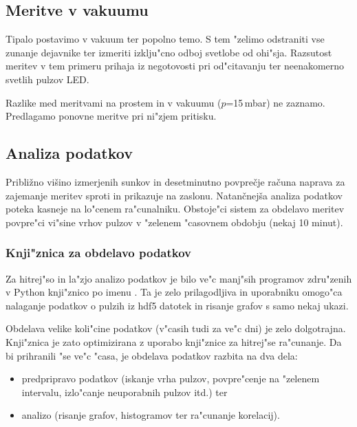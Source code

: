 \documentclass[12pt,a4paper]{article}
\begin{document}
\subsection{Meritve v vakuumu}
Tipalo postavimo v vakuum ter popolno temo. S tem "zelimo odstraniti vse zunanje dejavnike ter izmeriti izklju"cno odboj svetlobe od ohi"sja. Razsutost meritev v tem primeru prihaja iz negotovosti pri od"citavanju ter neenakomerno svetlih pulzov LED.

Razlike med meritvami na prostem in v vakuumu ($p$=15\,mbar) ne zaznamo. Predlagamo ponovne meritve pri ni"zjem pritisku.

\subsection{Analiza podatkov}

Približno višino izmerjenih sunkov in desetminutno povprečje računa naprava za zajemanje meritev sproti in prikazuje na zaslonu. 
Natančnejša analiza podatkov poteka kasneje na lo"cenem ra"cunalniku.  Obstoje"ci sistem za obdelavo meritev povpre"ci vi"sine vrhov pulzov v "zelenem "casovnem obdobju (nekaj 10 minut).


\subsubsection{Knji"znica za obdelavo podatkov}
Za hitrej"so in la"zjo analizo podatkov je bilo ve"c manj"sih programov zdru"zenih v Python knji"znico po imenu . Ta je zelo prilagodljiva in uporabniku omogo"ca nalaganje podatkov o pulzih iz hdf5 \cite{hdf5} datotek in risanje grafov s samo nekaj ukazi.

Obdelava velike koli"cine podatkov (v"casih tudi za ve"c dni) je zelo dolgotrajna. Knji"znica  je zato optimizirana z uporabo knji"znice  za hitrej"se ra"cunanje. Da bi prihranili "se ve"c "casa, je obdelava podatkov razbita na dva dela:
\begin{itemize}
	\item predpripravo podatkov (iskanje vrha pulzov, povpre"cenje na "zelenem intervalu, izlo"canje neuporabnih pulzov itd.) ter
	\item analizo (risanje grafov, histogramov ter ra"cunanje korelacij).
\end{itemize}
\end{document}
